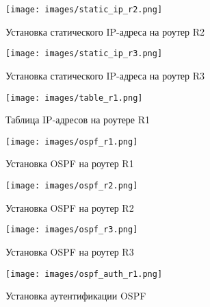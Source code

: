 \documentclass[14pt, a4paper]{article}
\begin{document}
    \begin{figure}[H]
        \centering
        \texttt{[image: images/static\_ip\_r2.png]}
        \caption{Установка статического IP-адреса на роутер R2}
    \end{figure}

    \begin{figure}[H]
        \centering
        \texttt{[image: images/static\_ip\_r3.png]}
        \caption{Установка статического IP-адреса на роутер R3}
    \end{figure}

    \begin{figure}[H]
        \centering
        \texttt{[image: images/table\_r1.png]}
        \caption{Таблица IP-адресов на роутере R1}
    \end{figure}

    \begin{figure}[H]
        \centering
        \texttt{[image: images/ospf\_r1.png]}
        \caption{Установка OSPF на роутер R1}
    \end{figure}

    \begin{figure}[H]
        \centering
        \texttt{[image: images/ospf\_r2.png]}
        \caption{Установка OSPF на роутер R2}
    \end{figure}

    \begin{figure}[H]
        \centering
        \texttt{[image: images/ospf\_r3.png]}
        \caption{Установка OSPF на роутер R3}
    \end{figure}

    \begin{figure}[H]
        \centering
        \texttt{[image: images/ospf\_auth\_r1.png]}
        \caption{Установка аутентификации OSPF}
    \end{figure}
\end{document}
